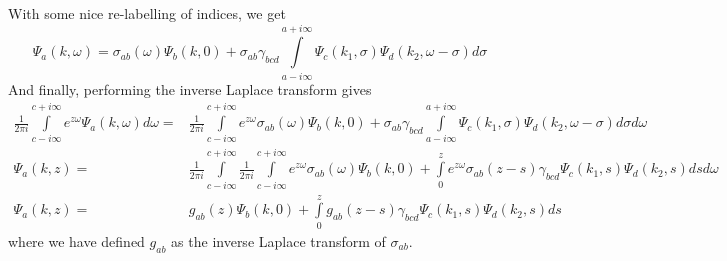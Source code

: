 With some nice re-labelling of indices, we get
\begin{equation}
			\Psi_a(k,\omega) = \sigma_{ab}(\omega)\Psi_{b}(k,0) + \sigma_{ab}\gamma_{bcd}\int\limits_{a-i\infty}^{a+i\infty}\Psi_c(k_1,\sigma)\Psi_d(k_2,\omega-\sigma)d\sigma
\end{equation}
And finally, performing the inverse Laplace transform gives
\begin{equation}
	\begin{split}
		\frac{1}{2\pi i}\int\limits_{c-i\infty}^{c+i\infty}e^{z\omega}\Psi_a(k,\omega)d\omega =& \frac{1}{2\pi i}\int\limits_{c-i\infty}^{c+i\infty}e^{z\omega}\sigma_{ab}(\omega)\Psi_{b}(k,0) + \sigma_{ab}\gamma_{bcd}\int\limits_{a-i\infty}^{a+i\infty}\Psi_c(k_1,\sigma)\Psi_d(k_2,\omega-\sigma)d\sigma d\omega \\
		\Psi_a(k,z) =& \frac{1}{2\pi i}\int\limits_{c-i\infty}^{c+i\infty} \frac{1}{2\pi i}\int\limits_{c-i\infty}^{c+i\infty}e^{z\omega}\sigma_{ab}(\omega) \Psi_b(k,0) + \int\limits_0^z e^{z\omega}\sigma_{ab}(z-s) \gamma_{bcd}\Psi_c(k_1,s)\Psi_d(k_2,s) dsd\omega \\
		\Psi_a(k,z) =& g_{ab}(z)\Psi_b(k,0) + \int\limits_{0}^{z}g_{ab}(z-s)\gamma_{bcd}\Psi_c(k_1,s)\Psi_d(k_2,s) ds
	\end{split}
\end{equation}
where we have defined $g_{ab}$ as the inverse Laplace transform of $\sigma_{ab}$. 

















